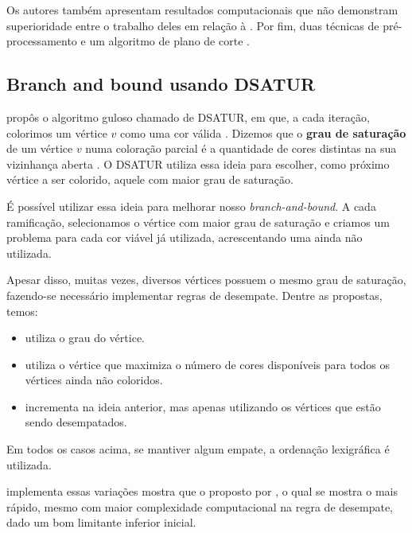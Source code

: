 \documentclass[11pt]{article}
\begin{document}
Os autores também apresentam resultados computacionais que não demonstram superioridade entre o trabalho deles em relação à \textcite{Mehrotra1996ColumnGenerationApproach}.
Por fim, duas técnicas de pré-processamento e um algoritmo de plano de corte .
\subsection{Branch and bound usando DSATUR}
\label{sec:org0e17196}
\textcite{Brelaz1979Newmethodscolor} propôs o algoritmo guloso chamado de DSATUR, em que, a cada iteração, colorimos um vértice \(v\) como uma cor válida .
Dizemos que o \textbf{grau de saturação}  de um vértice \(v\) numa coloração parcial  é a quantidade de cores distintas na sua vizinhança aberta .
O DSATUR utiliza essa ideia para escolher, como próximo vértice a ser colorido, aquele com maior grau de saturação.

É possível utilizar essa ideia para melhorar nosso \emph{branch-and-bound}.
A cada ramificação, selecionamos o vértice com maior grau de saturação e criamos um problema para cada cor viável já utilizada, acrescentando uma ainda não utilizada.

Apesar disso, muitas vezes, diversos vértices possuem o mesmo grau de saturação, fazendo-se necessário implementar regras de desempate.
Dentre as propostas, temos:
\begin{itemize}
\item \textcite{Brelaz1979Newmethodscolor} utiliza o grau do vértice.
\item \textcite{Sewell1996improvedalgorithmexact} utiliza o vértice que maximiza o número de cores disponíveis para todos os vértices ainda não coloridos.
\item \textcite{Segundo2012newDSATURbased} incrementa na ideia anterior, mas apenas utilizando os vértices que estão sendo desempatados.
\end{itemize}
Em todos os casos acima, se mantiver algum empate, a ordenação lexigráfica é utilizada.

\textcite{Ternier2017ExactAlgorithmsVertex} implementa essas variações mostra que o proposto por \textcite{Sewell1996improvedalgorithmexact}, o qual se mostra o mais rápido, mesmo com maior complexidade computacional na regra de desempate, dado um bom limitante inferior inicial.
\end{document}
